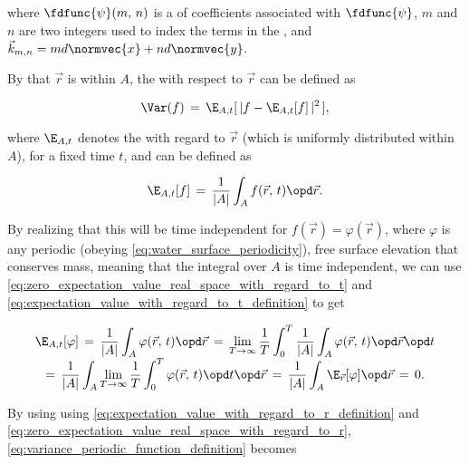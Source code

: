 {where $\fdfunc{\psi}(m,\,n)$ is a \twodimensional \sequence of coefficients associated with $\fdfunc{\psi}$, $m$ and $n$ are two integers used to index the terms in the \series, and $\vec{k}_{m,n} = md\normvec{x} + nd\normvec{y}$.

\comment
{
By \assuming that $\vec{r}$ is  within $A$, the  with respect to $\vec{r}$ can be defined as

\begin{equation} \label{eq:variance_periodic_function_definition}
\Var(f) \,=\, \E_{A,t}[\,|f - \E_{A,t}[f]\,|^2\,],
\end{equation}

where $\E_{A,t}$ denotes the  with regard to  $\vec{r}$ (which is uniformly distributed within $A$), for a fixed time $t$, and can be defined as

\begin{equation} \label{eq:expectation_value_with_regard_to_r_definition}
\E_{A,t}[f] \,=\, \frac{1}{|A|}\int_A f(\vec{r},\,t)\opd\vec{r}.
\end{equation}

By realizing that this  will be time independent for $f(\vec{r}) = \varphi(\vec{r})$, where $\varphi$ is any periodic (obeying \eqref{eq:water_surface_periodicity}), free surface elevation that conserves mass, meaning that the integral over $A$ is time independent, we can use \eqref{eq:zero_expectation_value_real_space_with_regard_to_t} and \eqref{eq:expectation_value_with_regard_to_t_definition} to get

\begin{equation} \label{eq:zero_expectation_value_real_space_with_regard_to_r}
\renewcommand*{\arraystretch}{2}
\begin{array}{c}
\displaystyle \E_{A,t}[\varphi] \,=\, \frac{1}{|A|}\int_A \varphi(\vec{r},\,t)\opd\vec{r} \,=\, \lim_{T\to\infty}\frac{1}{T}\int_0^T\frac{1}{|A|}\int_A \varphi(\vec{r},\,t)\opd\vec{r}\opd t \\
\displaystyle =\, \frac{1}{|A|}\int_A\lim_{T\to\infty}\frac{1}{T}\int_0^T \varphi(\vec{r},\,t)\opd t\opd\vec{r} \,=\, \frac{1}{|A|}\int_A \E_{\vec{r}}[\varphi]\opd\vec{r} \,=\, 0.
\end{array}
\end{equation}

By using using \eqref{eq:expectation_value_with_regard_to_r_definition} and \eqref{eq:zero_expectation_value_real_space_with_regard_to_r}, \eqref{eq:variance_periodic_function_definition} becomes

}}
